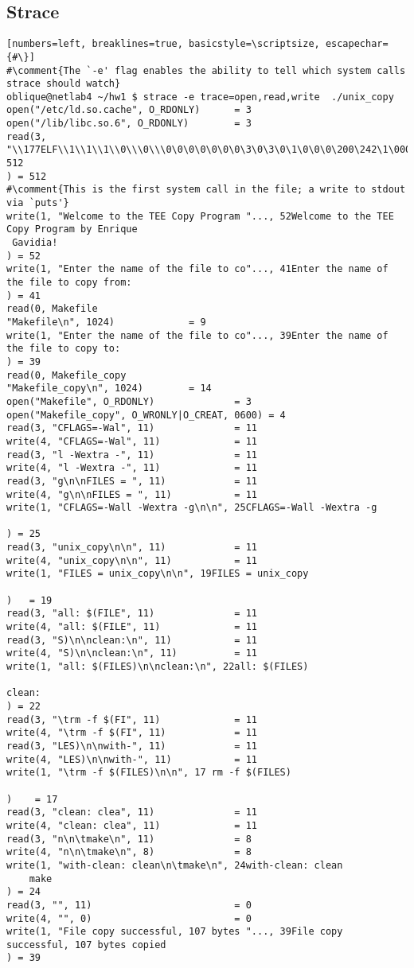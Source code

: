 \documentclass[12pt]{article}
\newcommand {\comment}[1] {\textcolor{red}{#1}}
\begin{document}
\subsection*{Strace}
\begin{lstlisting}[numbers=left, breaklines=true, basicstyle=\scriptsize, escapechar={#\}]
#\comment{The `-e' flag enables the ability to tell which system calls strace should watch}
oblique@netlab4 ~/hw1 $ strace -e trace=open,read,write  ./unix_copy
open("/etc/ld.so.cache", O_RDONLY)      = 3
open("/lib/libc.so.6", O_RDONLY)        = 3
read(3, "\\177ELF\\1\\1\\1\\0\\\0\\\0\0\0\0\0\0\0\3\0\3\0\1\0\0\0\200\242\1\0004\0\0\0"..., 512
) = 512
#\comment{This is the first system call in the file; a write to stdout via `puts'}
write(1, "Welcome to the TEE Copy Program "..., 52Welcome to the TEE Copy Program by Enrique
 Gavidia!
) = 52
write(1, "Enter the name of the file to co"..., 41Enter the name of the file to copy from:
) = 41
read(0, Makefile
"Makefile\n", 1024)             = 9
write(1, "Enter the name of the file to co"..., 39Enter the name of the file to copy to:
) = 39
read(0, Makefile_copy
"Makefile_copy\n", 1024)        = 14
open("Makefile", O_RDONLY)              = 3
open("Makefile_copy", O_WRONLY|O_CREAT, 0600) = 4
read(3, "CFLAGS=-Wal", 11)              = 11
write(4, "CFLAGS=-Wal", 11)             = 11
read(3, "l -Wextra -", 11)              = 11
write(4, "l -Wextra -", 11)             = 11
read(3, "g\n\nFILES = ", 11)            = 11
write(4, "g\n\nFILES = ", 11)           = 11
write(1, "CFLAGS=-Wall -Wextra -g\n\n", 25CFLAGS=-Wall -Wextra -g

) = 25
read(3, "unix_copy\n\n", 11)            = 11
write(4, "unix_copy\n\n", 11)           = 11
write(1, "FILES = unix_copy\n\n", 19FILES = unix_copy

)   = 19
read(3, "all: $(FILE", 11)              = 11
write(4, "all: $(FILE", 11)             = 11
read(3, "S)\n\nclean:\n", 11)           = 11
write(4, "S)\n\nclean:\n", 11)          = 11
write(1, "all: $(FILES)\n\nclean:\n", 22all: $(FILES)

clean:
) = 22
read(3, "\trm -f $(FI", 11)             = 11
write(4, "\trm -f $(FI", 11)            = 11
read(3, "LES)\n\nwith-", 11)            = 11
write(4, "LES)\n\nwith-", 11)           = 11
write(1, "\trm -f $(FILES)\n\n", 17	rm -f $(FILES)

)    = 17
read(3, "clean: clea", 11)              = 11
write(4, "clean: clea", 11)             = 11
read(3, "n\n\tmake\n", 11)              = 8
write(4, "n\n\tmake\n", 8)              = 8
write(1, "with-clean: clean\n\tmake\n", 24with-clean: clean
	make
) = 24
read(3, "", 11)                         = 0
write(4, "", 0)                         = 0
write(1, "File copy successful, 107 bytes "..., 39File copy successful, 107 bytes copied
) = 39
\end{lstlisting}
\end{document}
